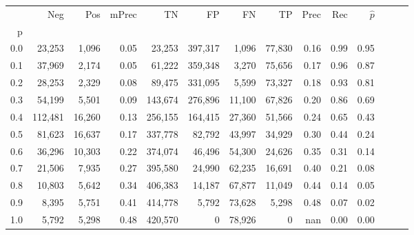 \begin{tabular}{rrrrrrrrrrrrrr}
\toprule
{} &      Neg &     Pos & mPrec &       TN &       FP &      FN &      TP &  Prec &   Rec & $\hat{p}$ \\
p   &          &         &       &          &          &         &         &       &       &           \\
\midrule
0.0 &   23,253 &   1,096 &  0.05 &   23,253 &  397,317 &   1,096 &  77,830 &  0.16 &  0.99 &      0.95 \\
0.1 &   37,969 &   2,174 &  0.05 &   61,222 &  359,348 &   3,270 &  75,656 &  0.17 &  0.96 &      0.87 \\
0.2 &   28,253 &   2,329 &  0.08 &   89,475 &  331,095 &   5,599 &  73,327 &  0.18 &  0.93 &      0.81 \\
0.3 &   54,199 &   5,501 &  0.09 &  143,674 &  276,896 &  11,100 &  67,826 &  0.20 &  0.86 &      0.69 \\
0.4 &  112,481 &  16,260 &  0.13 &  256,155 &  164,415 &  27,360 &  51,566 &  0.24 &  0.65 &      0.43 \\
0.5 &   81,623 &  16,637 &  0.17 &  337,778 &   82,792 &  43,997 &  34,929 &  0.30 &  0.44 &      0.24 \\
0.6 &   36,296 &  10,303 &  0.22 &  374,074 &   46,496 &  54,300 &  24,626 &  0.35 &  0.31 &      0.14 \\
0.7 &   21,506 &   7,935 &  0.27 &  395,580 &   24,990 &  62,235 &  16,691 &  0.40 &  0.21 &      0.08 \\
0.8 &   10,803 &   5,642 &  0.34 &  406,383 &   14,187 &  67,877 &  11,049 &  0.44 &  0.14 &      0.05 \\
0.9 &    8,395 &   5,751 &  0.41 &  414,778 &    5,792 &  73,628 &   5,298 &  0.48 &  0.07 &      0.02 \\
1.0 &    5,792 &   5,298 &  0.48 &  420,570 &        0 &  78,926 &       0 &   nan &  0.00 &      0.00 \\
\bottomrule
\end{tabular}
